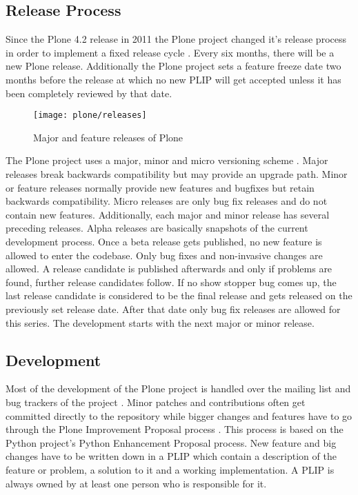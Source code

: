 
\subsection{Release Process} %
\label{sub:Release Process}

Since the Plone 4.2 release in 2011 the Plone project changed it's release
process in order to implement a fixed release cycle
\cite{PloneFixedReleaseCycle}. Every six months, there will be a new Plone
release. Additionally the Plone project sets a feature freeze date two months
before the release at which no new \ac{PLIP} will get accepted unless it has
been completely reviewed by that date.

\begin{figure}[htbp]
  \centering
  \texttt{[image: plone/releases]}
  \caption{Major and feature releases of Plone}
\end{figure}

The Plone project uses a major, minor and micro versioning scheme
\cite{PloneReleaseProcess,PloneCommunityProcesses}. Major releases break
backwards compatibility but may provide an upgrade path. Minor or feature
releases normally provide new features and bugfixes but retain backwards
compatibility. Micro releases are only bug fix releases and do not contain new
features. Additionally, each major and minor release has several preceding
releases. Alpha releases are basically snapshots of the current development
process. Once a beta release gets published, no new feature is allowed to enter
the codebase. Only bug fixes and non-invasive changes are allowed. A release
candidate is published afterwards and only if problems are found, further
release candidates follow. If no show stopper bug comes up, the last release
candidate is considered to be the final release and gets released on the
previously set release date. After that date only bug fix releases are allowed
for this series. The development starts with the next major or minor release.


\subsection{Development} %
\label{sub:Development}

Most of the development of the Plone project is handled over the mailing list
and bug trackers of the project \cite{PloneContribute,PloneCommunityProcesses}.
Minor patches and contributions often get committed directly to the repository
while bigger changes and features have to go through the Plone Improvement
Proposal process
\cite{PlonePLIPProcess,PloneCommunityProcesses,PlonePLIPLifecycle}. This
process is based on the Python project's Python Enhancement Proposal process.
New feature and big changes have to be written down in a \ac{PLIP} which
contain a description of the feature or problem, a solution to it and a working
implementation. A \ac{PLIP} is always owned by at least one person who is
responsible for it.

